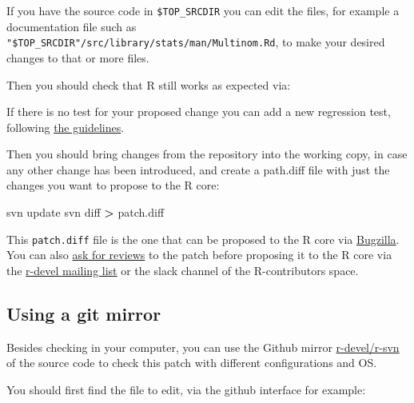 \documentclass[
]{book}
\newenvironment{Shaded}{\begin{snugshade}}{\end{snugshade}}
\newcommand{\BuiltInTok}[1]{#1}
\newcommand{\FunctionTok}[1]{\textcolor[rgb]{0.00,0.00,0.00}{#1}}
\newcommand{\NormalTok}[1]{#1}
\newcommand{\OperatorTok}[1]{\textcolor[rgb]{0.81,0.36,0.00}{\textbf{#1}}}
\newcommand{\StringTok}[1]{\textcolor[rgb]{0.31,0.60,0.02}{#1}}
\newcommand{\VariableTok}[1]{\textcolor[rgb]{0.00,0.00,0.00}{#1}}
\begin{document}
If you have the source code in \texttt{\$TOP\_SRCDIR} you can edit the files, for example a documentation file such as \texttt{"\$TOP\_SRCDIR"/src/library/stats/man/Multinom.Rd}, to make your desired changes to that or more files.

Then you should check that R still works as expected via:

\begin{Shaded}
\end{Shaded}

If there is no test for your proposed change you can add a new regression test, following \protect\hyperlink{TestR}{the guidelines}.

Then you should bring changes from the repository into the working copy, in case any other change has been introduced, and create a path.diff file with just the changes you want to propose to the R core:

\begin{Shaded}
\begin{Highlighting}[]
\FunctionTok{svn}\NormalTok{ update}
\FunctionTok{svn}\NormalTok{ diff }\OperatorTok{\textgreater{}}\NormalTok{ patch.diff}
\end{Highlighting}
\end{Shaded}

This \texttt{patch.diff} file is the one that can be proposed to the R core via \protect\hyperlink{SubmitPatches}{Bugzilla}. You can also \protect\hyperlink{PatchesReview}{ask for reviews} to the patch before proposing it to the R core via the \href{https://stat.ethz.ch/mailman/listinfo/r-devel}{r-devel mailing list} or the slack channel of the R-contributors space.

\hypertarget{using-a-git-mirror}{%
\subsection{Using a git mirror}\label{using-a-git-mirror}}

Besides checking in your computer, you can use the Github mirror \href{https://github.com/r-devel/r-svn}{r-devel/r-svn} of the source code to check this patch with different configurations and OS.

You should first find the file to edit, via the github interface for example:
\end{document}
